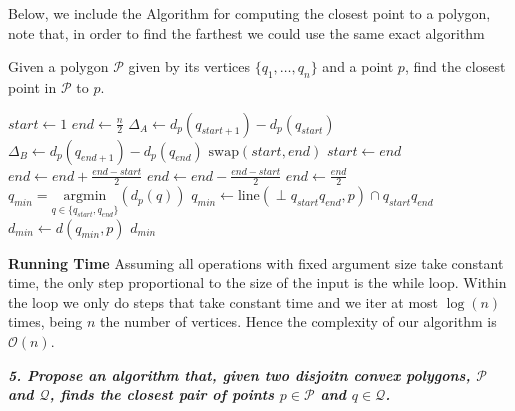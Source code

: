 \documentclass[a4paper, 10pt]{article}
\begin{document}
Below, we include the Algorithm for computing the closest point to a polygon, note that, in order to find the farthest we could use the same exact algorithm
\begin{algorithm}
    \caption{Given a polygon $\mathcal{P}$ given by its vertices $\lbrace q_1, \dots, q_n\rbrace$ and a point $p$, find the closest point in $\mathcal{P}$ to $p$. \label{alg:closest}}
  \begin{multicols}{2}
  \begin{algorithmic}[1]
        \State $start \gets 1$
        \State $end \gets \frac{n}{2}$
            \State $\Delta_A \gets d_p(q_{start + 1}) - d_p(q_{start})$
            \State $\Delta_B \gets d_p(q_{end + 1}) - d_p(q_{end})$
                \Case{$+ +$}
                    \State $\text{swap}(start, end)$ 
                \EndCase
                \Case{$+ -$}
                    \State $start \gets end$ 
                    \State $end \gets end + \frac{end - start}{2}$
                \EndCase
                \Case{$- +$}
                    \State $end \gets end - \frac{end - start}{2}$
                \EndCase
                \Case{$- -$}
                    \State $end \gets \frac{end}{2}$
                \EndCase
            \EndSwitch
        \EndWhile
            \State $q_{min} = \underset{q \in \lbrace q_{start}, q_{end}\rbrace}{\text{argmin}}{(d_p(q))}$
        \Else
            \State $q_{min} \gets \text{line}(\perp q_{start}q_{end}, p) \cap q_{start}q_{end}$
        \EndIf
        \State $d_{min} \gets d(q_{min}, p)$
        \State \Return $d_{min}$
  \end{algorithmic}
  \end{multicols}
\end{algorithm}

\textbf{Running Time} Assuming all operations with fixed argument size take constant time, the only step proportional to the size of the input is the while loop. Within the loop we only do steps that take constant time and we iter at most $\log(n)$ times, being $n$ the number of vertices. Hence the complexity of our algorithm is $\mathcal{O}(n)$.

\pagebreak 
\textbf{\textit{5. Propose an algorithm that, given two disjoitn convex polygons, $\mathcal{P}$ and $\mathcal{Q}$, finds the closest pair of points $p \in \mathcal{P}$ and $q \in \mathcal{Q}$.}}
\end{document}
